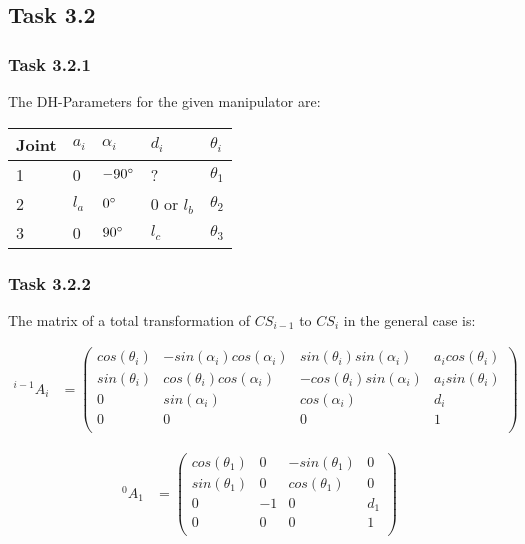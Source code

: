 \subsection*{Task 3.2}

\subsubsection*{Task 3.2.1}
The DH-Parameters for the given manipulator are:
\begin{center}
	\begin{tabular}{ | l | l | l | l | l |}
		\hline
		Joint & $a_{i}$ & $\alpha_{i}$ & $d_i$ & $\theta_i$ \\ \hline
		1 & 0 & $-90\degree$ & ? & $\theta_1$\\ \hline
		2 & $l_a$ & $0\degree$ & 0 or $l_b$ & $\theta_2$\\ \hline
		3 & 0 & $90\degree$ & $l_c$ & $\theta_3$\\ \hline
	\end{tabular}
\end{center}

\subsubsection*{Task 3.2.2}
The matrix of a total transformation of $CS_{i-1}$ to $CS_i$ in the general case is:

\begin{align*}
^{i-1}A_i &= 
\begin{pmatrix}
cos(\theta_i) & -sin(\alpha_i)cos(\alpha_i) & sin(\theta_i)sin(\alpha_i) & a_icos(\theta_i) \\
sin(\theta_i) & cos(\theta_i)cos(\alpha_i) & -cos(\theta_i)sin(\alpha_i) & a_isin(\theta_i) \\
0 & sin(\alpha_i) & cos(\alpha_i) & d_i \\
0 & 0 & 0 & 1 \\
\end{pmatrix}
\end{align*}

\begin{align*}
^{0}A_1 &= 
\begin{pmatrix}
cos(\theta_1) & 0 & -sin(\theta_1) & 0 \\
sin(\theta_1) & 0 & cos(\theta_1) & 0 \\
0 & -1 & 0 & d_1 \\
0 & 0 & 0 & 1 \\
\end{pmatrix}
\end{align*}

